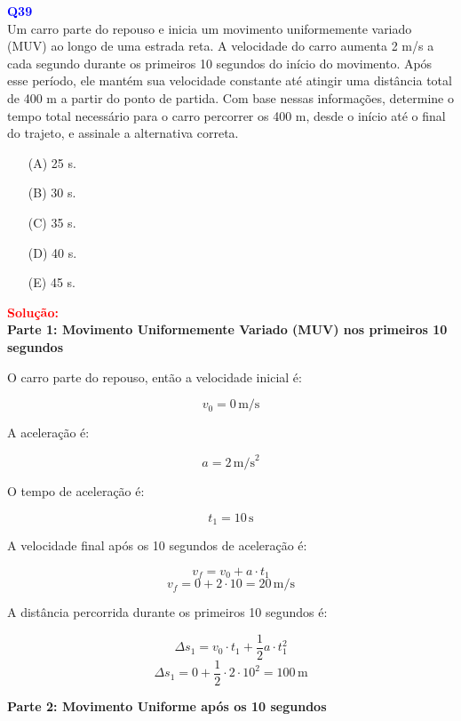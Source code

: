 \documentclass[a4paper,12pt]{article}
\begin{document}
\begin{flushleft}
\textbf{\textcolor{blue}{\Large Q39}}\\

Um carro parte do repouso e inicia um movimento
uniformemente variado (MUV) ao longo de uma
estrada reta. A velocidade do carro aumenta 2 m/s
a cada segundo durante os primeiros 10
segundos do início do movimento. Após esse
período, ele mantém sua velocidade constante até
atingir uma distância total de 400 m a partir do
ponto de partida. Com base nessas informações,
determine o tempo total necessário para o carro
percorrer os 400 m, desde o início até o final do
trajeto, e assinale a alternativa correta.

\begin{itemize}
    \item[(A)] 25 s.
    \item[(B)] 30 s.
    \item[(C)] 35 s.
    \item[(D)] 40 s.
    \item[(E)] 45 s.
\end{itemize}

\vspace{0.5cm}

\textcolor{red}{\textbf{Solução:}}\\

\textbf{Parte 1: Movimento Uniformemente Variado (MUV) nos primeiros 10 segundos}

O carro parte do repouso, então a velocidade inicial é:

\[
v_0 = 0 \, \text{m/s}
\]

A aceleração é:

\[
a = 2 \, \text{m/s}^2
\]

O tempo de aceleração é:

\[
t_1 = 10 \, \text{s}
\]

A velocidade final após os 10 segundos de aceleração é:

\[
v_f = v_0 + a \cdot t_1
\]
\[
v_f = 0 + 2 \cdot 10 = 20 \, \text{m/s}
\]

A distância percorrida durante os primeiros 10 segundos é:

\[
\Delta s_1 = v_0 \cdot t_1 + \frac{1}{2} a \cdot t_1^2
\]
\[
\Delta s_1 = 0 + \frac{1}{2} \cdot 2 \cdot 10^2 = 100 \, \text{m}
\]

\vspace{0.5cm}

\textbf{Parte 2: Movimento Uniforme após os 10 segundos}


\end{flushleft}
\end{document}
